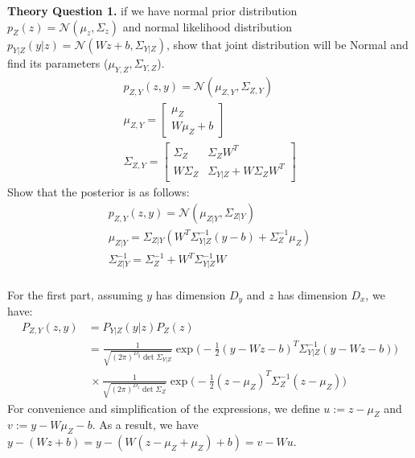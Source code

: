 \documentclass[11pt,a4paper]{article}
\begin{document}
	\color{blue}
	\large{\textbf{Theory Question 1.}} if we have normal prior distribution $p_Z(z) = \mathcal{N}(\mu_z,\Sigma_z)$ and normal
likelihood distribution $p_{Y|Z}(y|z) = \mathcal{N}(Wz + b,\Sigma_{Y|Z})$, show that joint distribution will be
Normal and find its parameters ($\mu_{Y,Z},\Sigma_{Y,Z}$).
	\begin{gather*}
p_{Z,Y}(z, y) = \mathcal{N}(\mu_{Z,Y},\Sigma_{Z,Y})
\\
\mu_{Z,Y}=
\begin{bmatrix}
\mu_Z \\
W\mu_Z+b
\end{bmatrix}
\\
\Sigma_{Z,Y}=
\begin{bmatrix}
\Sigma_Z & \Sigma_ZW^T \\
W\Sigma_Z & \Sigma_{Y|Z}+W\Sigma_ZW^T
\end{bmatrix}
	\end{gather*}
Show that the posterior is as follows:
	\begin{gather*}
p_{Z,Y}(z, y) = \mathcal{N}(\mu_{Z|Y},\Sigma_{Z|Y})
\\
\mu_{Z|Y}=\Sigma_{Z|Y}(W^T\Sigma_{Y|Z}^{-1}(y-b)+\Sigma_Z^{-1}\mu_Z)
\\
\Sigma_{Z|Y}^{-1}= \Sigma_Z^{-1}+W^T\Sigma_{Y|Z}^{-1}W
	\end{gather*}
	\color{black}
	\\ For the first part, assuming $y$ has dimension $D_y$ and $z$ has dimension $D_x$, we have:
\begin{align*}
P_{Z,Y}(z,y)&=P_{Y|Z}(y|z)P_Z(z)\\
&=\frac{1}{\sqrt{(2\pi)^{D_y}\det \Sigma_{Y|Z}}}\exp \Big(-\frac{1}{2}(y-Wz-b)^T\Sigma_{Y|Z}^{-1}(y-Wz-b)\Big) \\
&\,\times \frac{1}{\sqrt{(2\pi)^{D_z}\det \Sigma_{Z}}}\exp \Big(-\frac{1}{2}(z-\mu_Z)^T\Sigma_{Z}^{-1}(z-\mu_Z)\Big)
\end{align*}
For convenience and simplification of the expressions, we define $u:= z-\mu_Z$ and $v:=y-W\mu_Z-b$. As a result, we have $y-(Wz+b)=y-(W(z-\mu_Z+\mu_Z)+b)=v-Wu$.
\end{document}
